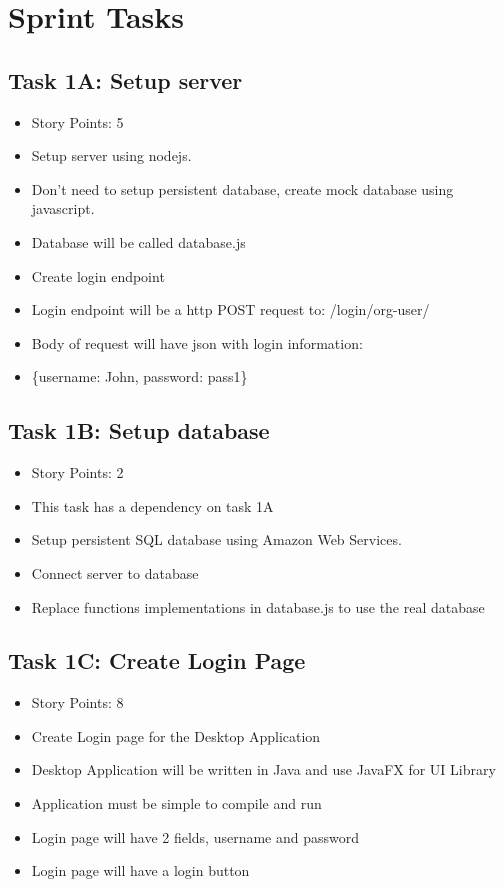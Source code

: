 \documentclass[12pt]{article}
\begin{document}
\textcolor{black}{\tableofcontents}
\pagebreak


\section{Sprint Tasks}

\subsection{Task 1A: Setup server}
\begin{itemize}%
\item Story Points: 5
\item Setup server using nodejs.
\item Don't need to setup persistent database, create mock database using javascript.
\item Database will be called database.js
\item Create login endpoint
\item Login endpoint will be a http POST request to: /login/org-user/
\item Body of request will have json with login information: 
\item \{username: John, password: pass1\}
\end{itemize}

\subsection{Task 1B: Setup database}
\begin{itemize}%
\item Story Points: 2
\item This task has a dependency on task 1A
\item Setup persistent SQL database using Amazon Web Services.
\item Connect server to database
\item Replace functions implementations in database.js to use the real database
\end{itemize}

\subsection{Task 1C: Create Login Page}
\begin{itemize}%
\item Story Points: 8
\item Create Login page for the Desktop Application
\item Desktop Application will be written in Java and use JavaFX for UI Library
\item Application must be simple to compile and run
\item Login page will have 2 fields, username and password
\item Login page will have a login button
\end{itemize}
\end{document}
